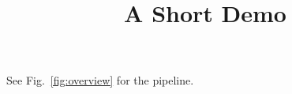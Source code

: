 \documentclass[article]{jss}
\title{A Short Demo}
\begin{document}
See Fig.~\ref{fig:overview} for the pipeline.
\end{document}
